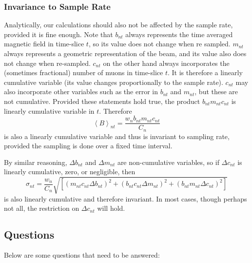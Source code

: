 \documentclass[twoside]{article}
\begin{document}
\subsubsection{Invariance to Sample Rate}
Analytically, our calculations should also not be affected by the sample rate, provided it is fine enough. Note that $b_{nt}$ always represents the time averaged magnetic field in time-slice $t$, so its value does not change when re sampled. $m_{nt}$ always represents a geometric representation of the beam, and its value also does not change when re-sampled. $c_{nt}$ on the other hand always incorporates the (sometimes fractional) number of muons in time-slice $t$. It is therefore a linearly cumulative variable (its value changes proportionally to the sample rate). $c_{nt}$ may also incorporate other variables such as the error in $b_{nt}$ and $m_{nt}$, but these are not cumulative. Provided these statements hold true, the product $b_{nt} m_{nt}  c_{nt}$ is linearly cumulative variable in $t$. Therefore
\begin{equation}
	\left\langle B \right\rangle_{nt} =
	\frac{w_n b_{nt} m_{nt} c_{nt}}{C_n}
\end{equation}
is also a linearly cumulative variable and thus is invariant to sampling rate, provided the sampling is done over a fixed time interval.

By similar reasoning, $\Delta b_{nt}$ and $\Delta m_{nt}$ are non-cumulative variables, so if $\Delta c_{nt}$ is linearly cumulative, zero, or negligible, then
\begin{equation}
	\sigma_{nt} =
	\frac{w_n}{C_n}\sqrt{[(m_{nt} c_{nt} \Delta b_{nt})^2 + (b_{nt} c_{nt} \Delta m_{nt})^2  + (b_{nt} m_{nt} \Delta c_{nt})^2 ]}
\end{equation}
is also linearly cumulative and therefore invariant. In most cases, though perhaps not all, the restriction on $\Delta c_{nt}$ will hold.



\newpage
\subsection{ Questions }
Below are some questions that need to be answered:
\end{document}
